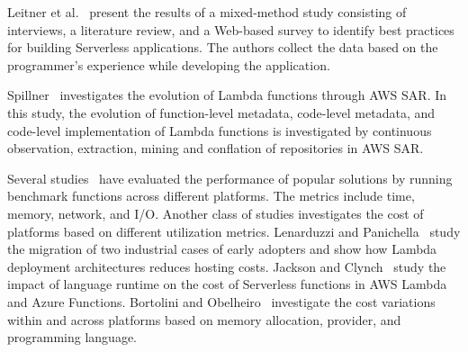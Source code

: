 Leitner et al.~\cite{leitner2019mixed} present the results of a mixed-method 
study consisting of interviews, a literature review, and a Web-based survey 
to identify best practices for building Serverless applications. 
The authors collect the data based on the programmer's experience while 
developing the application. 

Spillner~\cite{spillner2019quantitative} investigates the 
evolution of Lambda functions through AWS SAR. 
In this study, the evolution of function-level metadata, 
code-level metadata, and code-level implementation of 
Lambda functions is investigated by continuous observation, 
extraction, mining and conflation of repositories in AWS SAR.


Several studies~\cite{wang2018peeking,lloyd2018serverless,figiela2018performance,lee2018evaluation,mcgrath2017serverless,back2018using,mohanty2018evaluation} 
have evaluated the performance of popular \faas solutions by running 
benchmark functions across different platforms. The metrics include time, 
memory, network, and I/O. Another class of studies investigates the cost of \faas platforms 
based on different utilization metrics. Lenarduzzi and Panichella~\cite{adzic2017serverless} 
study the migration of two industrial cases of early adopters
and show how Lambda deployment architectures reduces hosting costs. 
Jackson and Clynch~\cite{jackson2018investigation} study the impact of 
language runtime on the cost of Serverless functions in AWS Lambda and 
Azure Functions. Bortolini and Obelheiro~\cite{bortolini2019investigating} 
investigate the cost variations within and across \faas platforms 
based on memory allocation, \faas provider, and 
programming language. 



